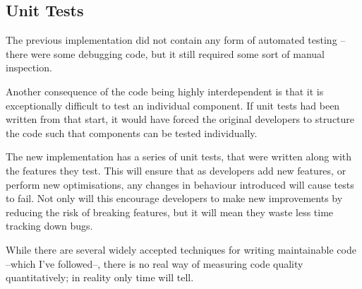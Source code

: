 \subsection{Unit Tests}
The previous implementation did not contain any form of automated testing -- there were some debugging code, but it still required some sort of manual inspection.

Another consequence of the code being highly interdependent is that it is exceptionally difficult to test an individual component. If unit tests had been written from that start, it would have forced the original developers to structure the code such that components can be tested individually.

The new implementation has a series of unit tests, that were written along with the features they test. This will ensure that as developers add new features, or perform new optimisations, any changes in behaviour introduced will cause tests to fail. Not only will this encourage developers to make new improvements by reducing the risk of breaking features, but it will mean they waste less time tracking down bugs.


While there are several widely accepted techniques for writing maintainable code --which I've followed--, there is no real way of measuring code quality quantitatively; in reality only time will tell.

